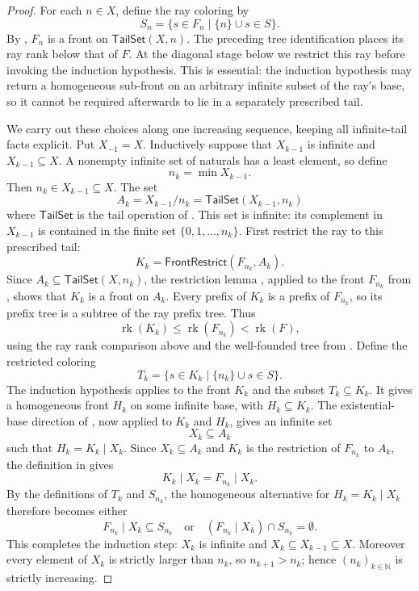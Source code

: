 \begin{proof}
For each $n\in X$, define the ray coloring by
\[
 S_n=\{s\in F_n\mid \{n\}\cup s\in S\}.
\]
By , $F_n$ is a front on
$\mathsf{TailSet}(X,n)$.  The preceding tree identification places its ray
rank below that of $F$.  At the diagonal stage below we restrict this ray
before invoking the induction hypothesis.  This is essential: the induction
hypothesis may return a homogeneous sub-front on an arbitrary infinite
subset of the ray's base, so it cannot be required afterwards to lie in a
separately prescribed tail.

We carry out these choices along one increasing sequence, keeping all
infinite-tail facts explicit.  Put $X_{-1}=X$.  Inductively suppose that
$X_{k-1}$ is infinite and $X_{k-1}\subseteq X$.  A nonempty infinite set of
naturals has a least element, so define
\[
 n_k=\min X_{k-1}.
\]
Then $n_k\in X_{k-1}\subseteq X$.  The set
\[
 A_k=X_{k-1}/n_k=\mathsf{TailSet}(X_{k-1},n_k)
\]
where $\mathsf{TailSet}$ is the tail operation of .  This
set is infinite: its complement in $X_{k-1}$ is contained in the finite set
$\{0,1,\ldots,n_k\}$.  First restrict the ray to this prescribed tail:
\[
 K_k=\mathsf{FrontRestrict}(F_{n_k},A_k).
\]
Since $A_k\subseteq\mathsf{TailSet}(X,n_k)$, the restriction lemma
, applied to the front $F_{n_k}$ from
, shows that $K_k$ is a front on $A_k$.
Every prefix of $K_k$ is a prefix of $F_{n_k}$, so its prefix tree is a
subtree of the ray prefix tree.  Thus
\[
 \mathop{\mathrm{rk}}(K_k)\leq\mathop{\mathrm{rk}}(F_{n_k})
 <\mathop{\mathrm{rk}}(F),
\]
using the ray rank comparison above and the well-founded tree from
.  Define the restricted coloring
\[
 T_k=\{s\in K_k\mid\{n_k\}\cup s\in S\}.
\]
The induction hypothesis applies to the front $K_k$ and the subset
$T_k\subseteq K_k$.  It gives a homogeneous front $H_k$ on some infinite
base, with $H_k\subseteq K_k$.  The existential-base direction of
, now applied to $K_k$ and $H_k$, gives an
infinite set
\[
 X_k\subseteq A_k
\]
such that $H_k=K_k\mathbin{|}X_k$.  Since $X_k\subseteq A_k$ and $K_k$ is
the restriction of $F_{n_k}$ to $A_k$, the definition in
 gives
\[
 K_k\mathbin{|}X_k=F_{n_k}\mathbin{|}X_k.
\]
By the definitions of $T_k$ and $S_{n_k}$, the homogeneous alternative for
$H_k=K_k\mathbin{|}X_k$ therefore becomes either
\[
 F_{n_k}\mathbin{|}X_k\subseteq S_{n_k}
 \quad\text{or}\quad
 (F_{n_k}\mathbin{|}X_k)\cap S_{n_k}=\emptyset.
\]
This completes the induction step: $X_k$ is infinite and
$X_k\subseteq X_{k-1}\subseteq X$.  Moreover every element of $X_k$ is
strictly larger than $n_k$, so $n_{k+1}>n_k$; hence $(n_k)_{k\in\mathbb N}$
is strictly increasing.


\end{proof}
